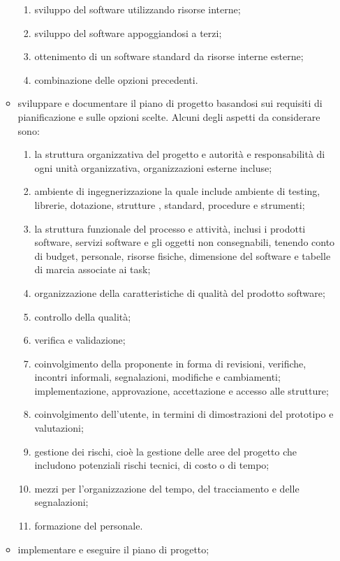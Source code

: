 \begin{itemize}
\begin{itemize}
\begin{enumerate}
\item sviluppo del software utilizzando risorse interne;
\item sviluppo del software appoggiandosi a terzi;
\item ottenimento di un software standard da risorse interne esterne;
\item combinazione delle opzioni precedenti.
\end{enumerate}

\item sviluppare e documentare il piano di progetto basandosi sui requisiti di pianificazione e sulle opzioni scelte. Alcuni degli aspetti da considerare sono:

\begin{enumerate}
\item la struttura organizzativa del progetto e autorità e responsabilità di ogni unità organizzativa, organizzazioni esterne incluse;
\item ambiente di ingegnerizzazione la quale include ambiente di testing, librerie, dotazione, strutture , standard, procedure e strumenti;
\item la struttura funzionale del processo e attività, inclusi i prodotti software, servizi software e gli oggetti non consegnabili, tenendo conto di budget, personale, risorse fisiche, dimensione del software e tabelle di marcia associate ai task;
\item organizzazione della caratteristiche di qualità del prodotto software;
\item controllo della qualità;
\item verifica e validazione;
\item coinvolgimento della proponente in forma di revisioni, verifiche, incontri informali, segnalazioni, modifiche e cambiamenti; implementazione, approvazione, accettazione e accesso alle strutture;
\item coinvolgimento dell'utente, in termini di dimostrazioni del prototipo e valutazioni;
\item gestione dei rischi, cioè la gestione delle aree del progetto che includono potenziali rischi tecnici, di costo o di tempo;
\item mezzi per l'organizzazione del tempo, del tracciamento e delle segnalazioni;
\item formazione del personale.     
\end{enumerate}
\item implementare e eseguire il piano di progetto;

\end{itemize}
\end{itemize}

